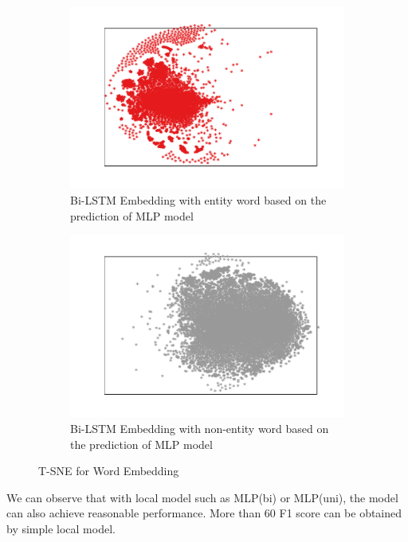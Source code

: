 \documentclass{article}
\begin{document}
\begin{figure}[t]
\begin{subfigure}{0.24\textwidth}
	\includegraphics[width=\linewidth]{bi_lstm_mlp_positive.pdf}
	\caption{Bi-LSTM Embedding with entity word based on the prediction of MLP model}
	\label{fig:bi_lstm_mlp_positive}
\end{subfigure}\hfil 
\begin{subfigure}{0.24\textwidth}
	\includegraphics[width=\linewidth]{bi_lstm_mlp_negative.pdf}
	\caption{Bi-LSTM Embedding with non-entity word based on the prediction of MLP model}
	\label{fig:bi_lstm_mlp_negative}
\end{subfigure}
\caption{T-SNE for Word Embedding}
\label{fig:embedding}
\end{figure}

We can observe that with local model such as MLP(bi) or MLP(uni), the model can also achieve reasonable performance. More than 60 F1 score can be obtained by simple local model. %
\end{document}
